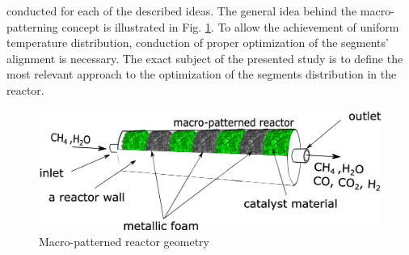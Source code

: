\documentclass[preprint,12pt]{elsarticle}
\begin{document}
conducted for each of the described ideas. The general idea behind the macro-patterning concept is illustrated in Fig. \ref{fig:react_pattern}. To allow the achievement of uniform temperature distribution, conduction of proper optimization of the segments' alignment is necessary.  The exact subject of the presented study is to define the most relevant approach to the optimization of the segments distribution in the reactor.


\begin{figure}[h!]
\centering
\includegraphics[width=150mm]{macro_geometry.eps}
\caption{\label{fig:react_pattern}{Macro-patterned reactor geometry}}
\end{figure}

\clearpage
\end{document}
